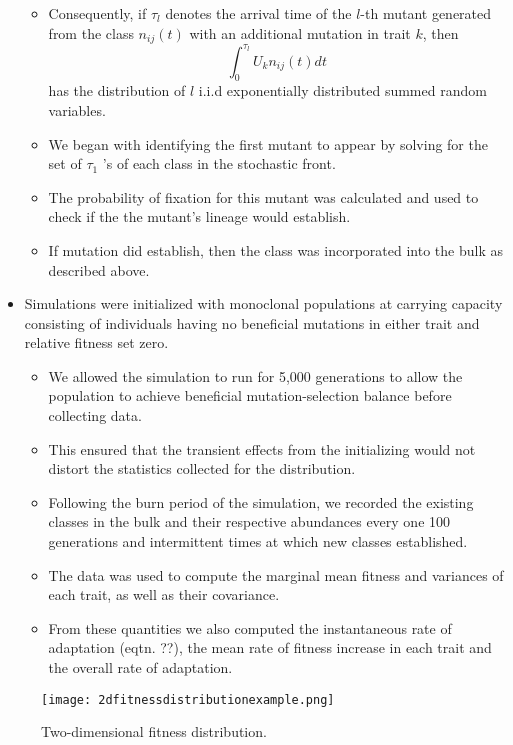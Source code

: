 \documentclass[11pt,one column]{article}
\begin{document}
\begin{itemize}
\begin{itemize}
	\item Consequently, if $\tau_l$ denotes the arrival time of the $l$-th mutant generated from the class $n_{ij}(t)$ with an additional mutation in trait $k$, then \[ \int_0^{\tau_l} U_k n_{ij}(t) dt \] has the distribution of $l$ i.i.d exponentially distributed summed random variables. 
	\item We began with identifying the first mutant to appear by solving for the set of $\tau_1$ 's of each class in the stochastic front.  
	\item The probability of fixation for this mutant was calculated and used to check if the the mutant's lineage would establish.  
	\item If mutation did establish, then the class was incorporated into the bulk as described above.  
	\end{itemize}
\item Simulations were initialized with monoclonal populations at carrying capacity consisting of individuals having no beneficial mutations in either trait and relative fitness set zero.
	\begin{itemize}
	\item We allowed the simulation to run for 5,000 generations to allow the population to achieve beneficial mutation-selection balance before collecting data.
	\item This ensured that the transient effects from the initializing would not distort the statistics collected for the distribution.
	\item Following the burn period of the simulation, we recorded the existing classes in the bulk and their respective abundances every one 100 generations and intermittent times at which new classes established.
	\item The data was used to compute the marginal mean fitness and variances of each trait, as well as their covariance.
	\item From these quantities we also computed the instantaneous rate of adaptation (eqtn. ??), the mean rate of fitness increase in each trait and the overall rate of adaptation.
	\end{itemize}
\end{itemize}

\begin{figure}[h]
	\centering
	\texttt{[image: 2dfitnessdistributionexample.png]} 
	\caption{Two-dimensional fitness distribution.} 
	\label{fig.1}
\end{figure}
	
\end{document}
